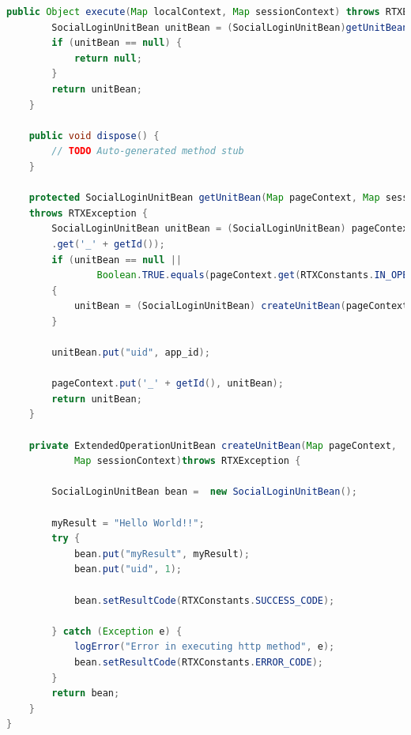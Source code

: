 \documentclass[oneside,12pt,a4paper]{memoir}%
\begin{document}
\begin{landscape}
\begin{lstlisting}[language=java, style=eclipse]
    public Object execute(Map localContext, Map sessionContext) throws RTXException {
    	SocialLoginUnitBean unitBean = (SocialLoginUnitBean)getUnitBean(localContext, sessionContext);
		if (unitBean == null) {
			return null;
		}
		return unitBean;
    }

    public void dispose() {
        // TODO Auto-generated method stub
    } 

	protected SocialLoginUnitBean getUnitBean(Map pageContext, Map sessionContext)
	throws RTXException {
		SocialLoginUnitBean unitBean = (SocialLoginUnitBean) pageContext
		.get('_' + getId());
		if (unitBean == null ||
				Boolean.TRUE.equals(pageContext.get(RTXConstants.IN_OPERATION_KEY)))
		{
			unitBean = (SocialLoginUnitBean) createUnitBean(pageContext, sessionContext);
		}
		
		unitBean.put("uid", app_id);
		
		pageContext.put('_' + getId(), unitBean);
		return unitBean;
	}
	 
	private ExtendedOperationUnitBean createUnitBean(Map pageContext,
			Map sessionContext)throws RTXException {
		
		SocialLoginUnitBean bean =  new SocialLoginUnitBean();

		myResult = "Hello World!!";
		try {
			bean.put("myResult", myResult);
			bean.put("uid", 1);
			
			bean.setResultCode(RTXConstants.SUCCESS_CODE);

		} catch (Exception e) {
			logError("Error in executing http method", e);
			bean.setResultCode(RTXConstants.ERROR_CODE);
		}
		return bean;
	}
}   
\end{lstlisting}
\end{landscape}
\end{document}
